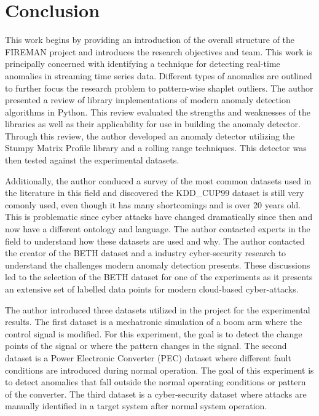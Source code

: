 \section{Conclusion}
\label{sec:conclusion}

This work begins by providing an introduction of the overall structure of the FIREMAN project and introduces the research objectives and team. This work is principally concerned with identifying a technique for detecting real-time anomalies in streaming time series data. Different types of anomalies are outlined to further focus the research problem to pattern-wise shaplet outliers. The author presented a review of library implementations of modern anomaly detection algorithms in Python. This review evaluated the strengths and weaknesses of the libraries as well as their applicability for use in building the anomaly detector. Through this review, the author developed an anomaly detector utilizing the Stumpy Matrix Profile library and a rolling range techniques. This detector was then tested against the experimental datasets. 

Additionally, the author conduced a survey of the most common datasets used in the literature in this field and discovered the KDD\_CUP99 dataset is still very comonly used, even though it has many shortcomings and is over 20 years old. This is problematic since cyber attacks have changed dramatically since then and now have a different ontology and language. The author contacted experts in the field to understand how these datasets are used and why. The author contacted the creator of the BETH dataset and a industry cyber-security research to understand the challenges modern anomaly detection presents. These discussions led to the selection of the BETH dataset for one of the experiments as it presents an extensive set of labelled data points for modern cloud-based cyber-attacks.

The author introduced three datasets utilized in the project for the experimental results. The first dataset is a mechatronic simulation of a boom arm where the control signal is modified. For this experiment, the goal is to detect the change points of the signal or where the pattern changes in the signal. The second dataset is a Power Electronic Converter (PEC) dataset where different fault conditions are introduced during normal operation. The goal of this experiment is to detect anomalies that fall outside the normal operating conditions or pattern of the converter. The third dataset is a cyber-security dataset where attacks are manually identified in a target system after normal system operation.

